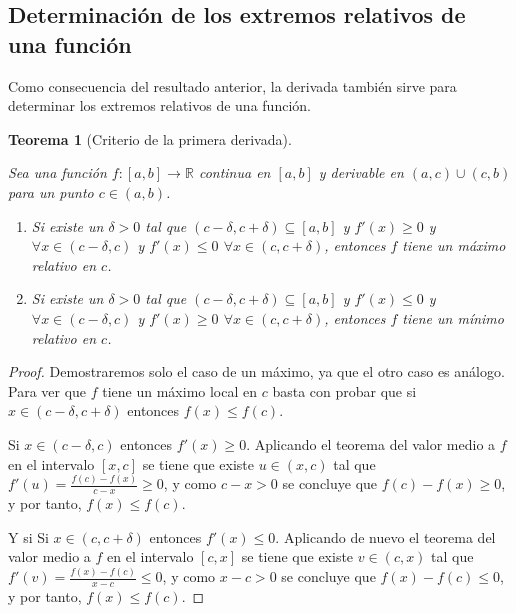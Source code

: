 \documentclass[
  a4paper,
]{scrreport}
\providecommand{\tightlist}{%
  \setlength{\itemsep}{0pt}\setlength{\parskip}{0pt}}\usepackage{longtable,booktabs,array}
\theoremstyle{definition}
\theoremstyle{plain}
\theoremstyle{definition}
\theoremstyle{definition}
\theoremstyle{plain}
\newtheorem{theorem}{Teorema}[chapter]
\theoremstyle{plain}
\theoremstyle{remark}
\begin{document}
\subsection{Determinación de los extremos relativos de una
función}\label{determinaciuxf3n-de-los-extremos-relativos-de-una-funciuxf3n}

Como consecuencia del resultado anterior, la derivada también sirve para
determinar los extremos relativos de una función.

\begin{theorem}[Criterio de la primera
derivada]\protect\hypertarget{thm-extremos-relativos}{}\label{thm-extremos-relativos}

Sea una función \(f:[a,b]\to\mathbb{R}\) continua en \([a,b]\) y
derivable en \((a,c)\cup (c,b)\) para un punto \(c\in(a,b)\).

\begin{enumerate}
\def\labelenumi{\alph{enumi}.}
\tightlist
\item
  Si existe un \(\delta>0\) tal que
  \((c-\delta, c+\delta)\subseteq[a,b]\) y \(f'(x)\geq 0\) y
  \(\forall x\in(c-\delta,c)\) y \(f'(x)\leq 0\)
  \(\forall x\in(c,c+\delta)\), entonces \(f\) tiene un \emph{máximo
  relativo} en \(c\).
\item
  Si existe un \(\delta>0\) tal que
  \((c-\delta, c+\delta)\subseteq[a,b]\) y \(f'(x)\leq 0\) y
  \(\forall x\in(c-\delta,c)\) y \(f'(x)\geq 0\)
  \(\forall x\in(c,c+\delta)\), entonces \(f\) tiene un \emph{mínimo
  relativo} en \(c\).
\end{enumerate}

\end{theorem}

\begin{tcolorbox}[enhanced jigsaw, leftrule=.75mm, colbacktitle=quarto-callout-note-color!10!white, toprule=.15mm, opacityback=0, opacitybacktitle=0.6, toptitle=1mm, breakable, bottomtitle=1mm, colframe=quarto-callout-note-color-frame, rightrule=.15mm, titlerule=0mm, title=\textcolor{quarto-callout-note-color}{\faInfo}\hspace{0.5em}{Demostración}, arc=.35mm, left=2mm, bottomrule=.15mm, colback=white, coltitle=black]

\begin{proof}
Demostraremos solo el caso de un máximo, ya que el otro caso es análogo.
Para ver que \(f\) tiene un máximo local en \(c\) basta con probar que
si \(x\in(c-\delta,c+\delta)\) entonces \(f(x)\leq f(c)\).

Si \(x\in(c-\delta,c)\) entonces \(f'(x)\geq 0\). Aplicando el teorema
del valor medio a \(f\) en el intervalo \([x,c]\) se tiene que existe
\(u\in(x,c)\) tal que \(f'(u)=\frac{f(c)-f(x)}{c-x}\geq 0\), y como
\(c-x>0\) se concluye que \(f(c)-f(x)\geq 0\), y por tanto,
\(f(x)\leq f(c)\).

Y si Si \(x\in(c, c+\delta)\) entonces \(f'(x)\leq 0\). Aplicando de
nuevo el teorema del valor medio a \(f\) en el intervalo \([c,x]\) se
tiene que existe \(v\in(c,x)\) tal que
\(f'(v)=\frac{f(x)-f(c)}{x-c}\leq 0\), y como \(x-c>0\) se concluye que
\(f(x)-f(c)\leq 0\), y por tanto, \(f(x)\leq f(c)\).
\end{proof}

\end{tcolorbox}
\end{document}
